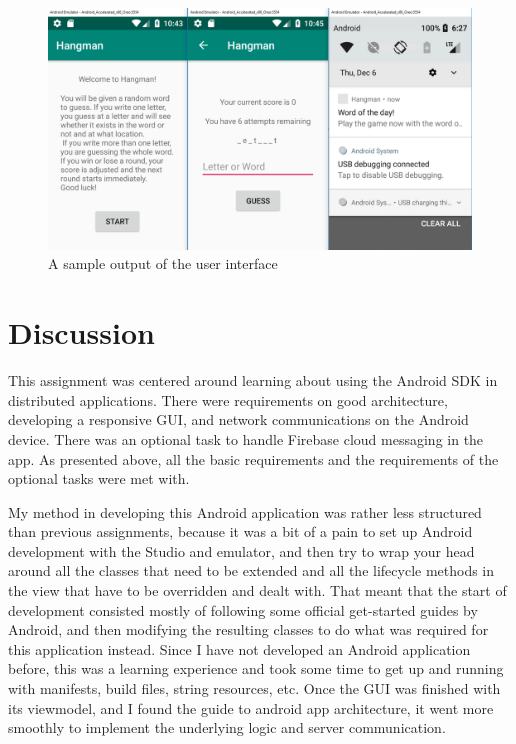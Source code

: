 \documentclass[a4paper]{scrartcl}
\begin{document}
\begin{figure}[h!]
    \begin{center}
        \includegraphics[scale=0.45]{ui.png}
        \caption{A sample output of the user interface}
        \label{fig:ui}
    \end{center}
\end{figure}

\section{Discussion}

This assignment was centered around learning about using the Android SDK in distributed applications. There were requirements on good architecture, developing a responsive GUI, and network communications on the Android device. There was an optional task to handle Firebase cloud messaging in the app. As presented above, all the basic requirements and the requirements of the optional tasks were met with.

My method in developing this Android application was rather less structured than previous assignments, because it was a bit of a pain to set up Android development with the Studio and emulator, and then try to wrap your head around all the classes that need to be extended and all the lifecycle methods in the view that have to be overridden and dealt with. That meant that the start of development consisted mostly of following some official get-started guides by Android, and then modifying the resulting classes to do what was required for this application instead. Since I have not developed an Android application before, this was a learning experience and took some time to get up and running with manifests, build files, string resources, etc. Once the GUI was finished with its viewmodel, and I found the guide to android app architecture, it went more smoothly to implement the underlying logic and server communication.
\end{document}
